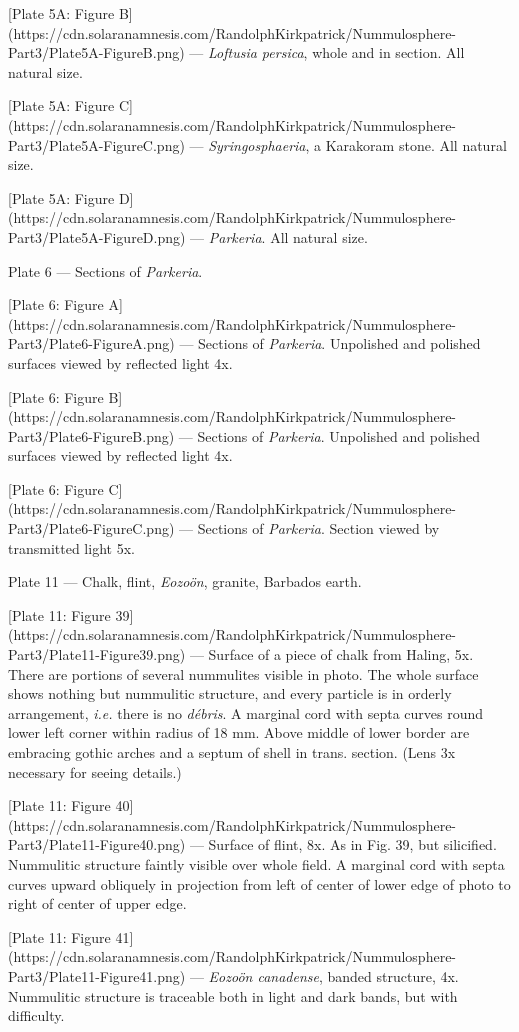 \documentclass[a4paper, 12pt, oneside]{article}
\begin{document}
[Plate 5A: Figure B](https://cdn.solaranamnesis.com/RandolphKirkpatrick/Nummulosphere-Part3/Plate5A-FigureB.png) --- \emph{Loftusia persica}, whole and in section. All natural size.

[Plate 5A: Figure C](https://cdn.solaranamnesis.com/RandolphKirkpatrick/Nummulosphere-Part3/Plate5A-FigureC.png) --- \emph{Syringosphaeria}, a Karakoram stone. All natural size.

[Plate 5A: Figure D](https://cdn.solaranamnesis.com/RandolphKirkpatrick/Nummulosphere-Part3/Plate5A-FigureD.png) --- \emph{Parkeria}. All natural size.

Plate 6 --- Sections of \emph{Parkeria}.

[Plate 6: Figure A](https://cdn.solaranamnesis.com/RandolphKirkpatrick/Nummulosphere-Part3/Plate6-FigureA.png) --- Sections of \emph{Parkeria}. Unpolished and polished surfaces viewed by reflected light 4x.

[Plate 6: Figure B](https://cdn.solaranamnesis.com/RandolphKirkpatrick/Nummulosphere-Part3/Plate6-FigureB.png) --- Sections of \emph{Parkeria}. Unpolished and polished surfaces viewed by reflected light 4x.

[Plate 6: Figure C](https://cdn.solaranamnesis.com/RandolphKirkpatrick/Nummulosphere-Part3/Plate6-FigureC.png) --- Sections of \emph{Parkeria}. Section viewed by transmitted light 5x.

Plate 11 --- Chalk, flint, \emph{Eozoön}, granite, Barbados earth.

[Plate 11: Figure 39](https://cdn.solaranamnesis.com/RandolphKirkpatrick/Nummulosphere-Part3/Plate11-Figure39.png) --- Surface of a piece of chalk from Haling, 5x. There are portions of several nummulites visible in photo. The whole surface shows nothing but nummulitic structure, and every particle is in orderly arrangement, \emph{i.e.} there is no \emph{débris}. A marginal cord with septa curves round lower left corner within radius of 18 mm. Above middle of lower border are embracing gothic arches and a septum of shell in trans. section. (Lens 3x necessary for seeing details.)

[Plate 11: Figure 40](https://cdn.solaranamnesis.com/RandolphKirkpatrick/Nummulosphere-Part3/Plate11-Figure40.png) --- Surface of flint, 8x. As in Fig. 39, but silicified. Nummulitic structure faintly visible over whole field. A marginal cord with septa curves upward obliquely in projection from left of center of lower edge of photo to right of center of upper edge.

[Plate 11: Figure 41](https://cdn.solaranamnesis.com/RandolphKirkpatrick/Nummulosphere-Part3/Plate11-Figure41.png) --- \emph{Eozoön canadense}, banded structure, 4x. Nummulitic structure is traceable both in light and dark bands, but with difficulty.
\end{document}
